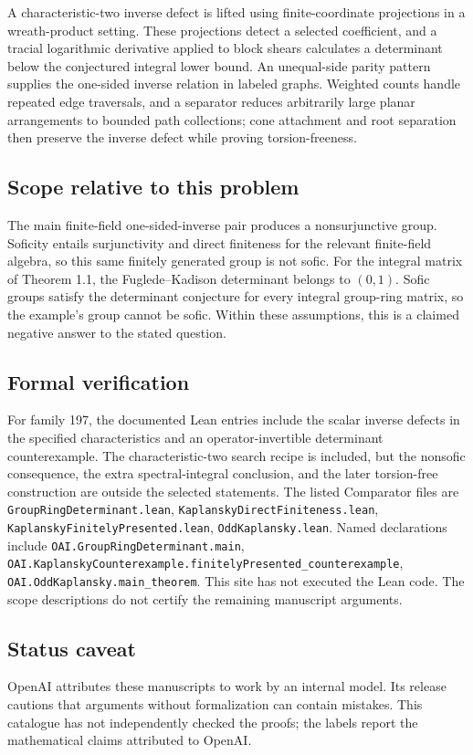 \documentclass[11pt]{article}
\begin{document}
A characteristic-two inverse defect is lifted using finite-coordinate projections in a wreath-product setting. These projections detect a selected coefficient, and a tracial logarithmic derivative applied to block shears calculates a determinant below the conjectured integral lower bound. An unequal-side parity pattern supplies the one-sided inverse relation in labeled graphs. Weighted counts handle repeated edge traversals, and a separator reduces arbitrarily large planar arrangements to bounded path collections; cone attachment and root separation then preserve the inverse defect while proving torsion-freeness.

\subsection{Scope relative to this problem}
The main finite-field one-sided-inverse pair produces a nonsurjunctive group. Soficity entails surjunctivity and direct finiteness for the relevant finite-field algebra, so this same finitely generated group is not sofic. For the integral matrix of Theorem 1.1, the Fuglede--Kadison determinant belongs to $(0,1)$. Sofic groups satisfy the determinant conjecture for every integral group-ring matrix, so the example’s group cannot be sofic. Within these assumptions, this is a claimed negative answer to the stated question.

\subsection{Formal verification}
For family 197, the documented Lean entries include the scalar inverse defects in the specified characteristics and an operator-invertible determinant counterexample. The characteristic-two search recipe is included, but the nonsofic consequence, the extra spectral-integral conclusion, and the later torsion-free construction are outside the selected statements. The listed Comparator files are \texttt{GroupRingDeterminant.lean}, \texttt{KaplanskyDirectFiniteness.lean}, \texttt{KaplanskyFinitelyPresented.lean}, \texttt{OddKaplansky.lean}. Named declarations include \texttt{OAI.GroupRingDeterminant.main}, \texttt{OAI.KaplanskyCounterexample.finitelyPresented\_counterexample}, \texttt{OAI.OddKaplansky.main\_theorem}. This site has not executed the Lean code. The scope descriptions do not certify the remaining manuscript arguments.

\subsection{Status caveat}
OpenAI attributes these manuscripts to work by an internal model. Its release cautions that arguments without formalization can contain mistakes. This catalogue has not independently checked the proofs; the labels report the mathematical claims attributed to OpenAI.
\end{document}

